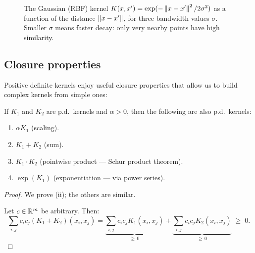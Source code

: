\begin{notechapter}
\begin{figure}[ht]
\centering
{}
\caption{The Gaussian (RBF) kernel $K(x,x') =
\exp(-\left\|x-x'\right\|^2/2\sigma^2)$ as a function of the distance
$\left\|x-x'\right\|$, for three bandwidth values $\sigma$. Smaller $\sigma$
means faster decay: only very nearby points have high similarity.}
\label{rkhs:fig:rbf_kernel}
\end{figure}

\subsection{Closure properties}
\label{rkhs:subsec:closure}

Positive definite kernels enjoy useful closure properties that allow us
to build complex kernels from simple ones:

\begin{proposition}
\label{rkhs:prop:closure}
If $K_1$ and $K_2$ are p.d.\ kernels and $\alpha > 0$, then the
following are also p.d.\ kernels:
\begin{enumerate}[label=(\roman*)]
  \item $\alpha K_1$ \quad (scaling).
  \item $K_1 + K_2$ \quad (sum).
  \item $K_1 \cdot K_2$ \quad (pointwise product --- Schur product theorem).
  \item $\exp(K_1)$ \quad (exponentiation --- via power series).
\end{enumerate}
\end{proposition}

\begin{proof}
We prove (ii); the others are similar.

Let $c \in \mathbb{R}^m$ be arbitrary. Then:
\[
\sum_{i,j} c_i c_j (K_1 + K_2)(x_i, x_j) = \underbrace{\sum_{i,j} c_i
c_j K_1(x_i, x_j)}_{\geq\, 0} + \underbrace{\sum_{i,j} c_i c_j K_2(x_i,
x_j)}_{\geq\, 0} \;\geq\; 0.
\]
\end{proof}


\end{notechapter}
